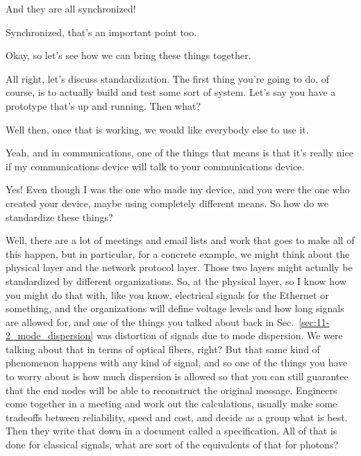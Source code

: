 \mmm And they are all synchronized!

\rrr Synchronized, that's an important point too.

\mmm Okay, so let's see how we can bring these things together.

\rrr All right, let's discuss standardization. The first thing you're going to do, of course, is to actually build and test some sort of system. Let's say you have a prototype that's up and running. Then what?

\mmm Well then, once that is working, we would like everybody else to use it.

\rrr Yeah, and in communications, one of the things that means is that it's really nice if my communications device will talk to your communications device.

\mmm Yes! Even though I was the one who made my device, and you were the one who created your device, maybe using completely different means. So how do we standardize these things?

\rrr Well, there are a lot of meetings and email lists and work that goes to make all of this happen, but in particular, for a concrete example, we might think about the physical layer and the network protocol layer. Those two layers might actually be standardized by different organizations. So, at the physical layer, so I know how you might do that with, like you know, electrical signals for the Ethernet or something, and the organizations will define voltage levels and how long signals are allowed for, and one of the things you talked about back in Sec.~\ref{sec:11-2_mode_dispersion} was distortion of signals due to mode dispersion. We were talking about that in terms of optical fibers, right? But that same kind of phenomenon happens with any kind of signal, and so one of the things you have to worry about is how much dispersion is allowed so that you can still guarantee that the end nodes will be able to reconstruct the original message. Engineers come together in a meeting and work out the calculations, usually make some tradeoffs between reliability, speed and cost, and decide as a group what is best.  Then they write that down in a document called a specification. All of that is done for classical signals, what are sort of the equivalents of that for photons?

